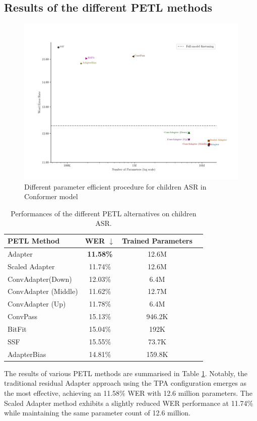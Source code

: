 \subsection{Results of the different PETL methods}

\begin{figure}
    \begin{center}
        \includegraphics[width=\textwidth]{imgs/Adapter_compare_withoutWide.png}
        \caption{Different parameter efficient procedure for children ASR in Conformer model}
        \label{fig:adapter_compared_withoutWide}
    \end{center}
\end{figure}
\begin{table}
    \centering
    \begin{tabular}{lccc}
        \toprule
        \textbf{PETL Method} & \textbf{WER $\downarrow$} & \textbf{Trained Parameters} \\
        \midrule
        Adapter & \textbf{11.58\%} & 12.6M \\
        Scaled Adapter & 11.74\% & 12.6M \\
        ConvAdapter(Down) & 12.03\% & 6.4M \\
        ConvAdapter (Middle) & 11.62\% & 12.7M \\
        ConvAdapter (Up) & 11.78\% & 6.4M \\
        ConvPass & 15.13\% & 946.2K \\
        BitFit & 15.04\% & 192K \\
        SSF & 15.55\% & 73.7K \\
        AdapterBias & 14.81\% & 159.8K \\
        \bottomrule
    \end{tabular}
    \caption{Performances of the different PETL alternatives on children ASR.}
    \label{tab:PETL_alternatives}
\end{table}
The results of various \ac{PETL} methods are summarised in Table \ref{tab:PETL_alternatives}. Notably, the traditional residual Adapter approach using the \ac{TPA} configuration emerges as the most effective, achieving an 11.58\% \ac{WER} with 12.6 million parameters. The Scaled Adapter method exhibits a slightly reduced \ac{WER} performance at 11.74\% while maintaining the same parameter count of 12.6 million.

